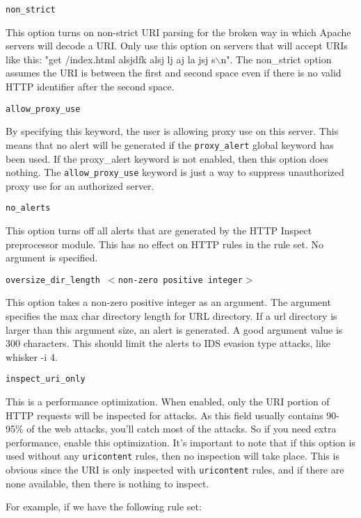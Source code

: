 \documentclass[english]{report}
\newcounter{slistnum}
\newenvironment{slist}
{ \begin{list}{ {\bf \arabic{slistnum}.} }{\usecounter{slistnum} } }
{ \end{list} }
\begin{document}
\begin{slist}
\item \texttt{non\_strict}

This option turns on non-strict URI parsing for the broken way in which Apache
servers will decode a URI.  Only use this option on servers that will accept
URIs like this: "get /index.html alsjdfk alsj lj aj  la jsj s$\backslash$n".
The non\_strict option assumes the URI is between the first and second space
even if there is no valid HTTP identifier after the second space.

\item \texttt{allow\_proxy\_use}

By specifying this keyword, the user is allowing proxy use on this server.
This means that no alert will be generated if the \texttt{proxy\_alert} global
keyword has been used.  If the proxy\_alert keyword is not enabled, then this
option does nothing.  The \texttt{allow\_proxy\_use} keyword is just a way to
suppress unauthorized proxy use for an authorized server.  

\item \texttt{no\_alerts}

This option turns off all alerts that are generated by the HTTP Inspect
preprocessor module.  This has no effect on HTTP rules in the rule set.  No
argument is specified.

\item \texttt{oversize\_dir\_length $<$non-zero positive integer$>$}

This option takes a non-zero positive integer as an argument.  The argument
specifies the max char directory length for URL directory.  If a url directory
is larger than this argument size, an alert is generated. A good argument value
is 300 characters.  This should limit the alerts to IDS evasion type attacks,
like whisker -i 4.

\item \texttt{inspect\_uri\_only}

This is a performance optimization.  When enabled, only the URI portion of HTTP
requests will be inspected for attacks.  As this field usually contains 90-95\%
of the web attacks, you'll catch most of the attacks.  So if you need extra
performance, enable this optimization.  It's important to note that if this
option is used without any \texttt{uricontent} rules, then no inspection will
take place.  This is obvious since the URI is only inspected with
\texttt{uricontent} rules, and if there are none available, then there is
nothing to inspect.

For example, if we have the following rule set:


\end{slist}
\end{document}
